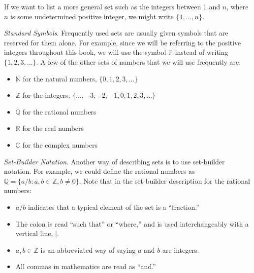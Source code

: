 \documentclass[10pt,]{book}
\theoremstyle{plain}
\theoremstyle{definition}
\begin{document}
If we want to list a more general set such as the integers between 1 and \( n\), where \( n\) is some undetermined positive integer, we
might write \(\{1,\ldots ,n\}\).
%
\par
\emph{ Standard Symbols}. Frequently used sets are usually given symbols that are reserved for them alone. For example, since we will be
referring to the positive integers throughout this book, we will use the symbol \(\mathbb{P}\) instead of writing \(\{1, 2, 3, \ldots \}\). A few
of the other sets of numbers that we will use frequently are: 
\leavevmode%
\begin{itemize}[label=\textbullet]
\item{}\(\mathbb{N}\) for the natural numbers, \(\{0, 1, 2, 3, \ldots \}\)\item{}\(\mathbb{Z}\) for the integers, \(\{\ldots , -3, -2, -1, 0, 1, 2, 3,\ldots \}\)\item{}\(\mathbb{Q}\) for the rational numbers\item{}\(\mathbb{R}\) for the real numbers\item{}\(\mathbb{C}\) for the complex numbers\end{itemize}

%
\par
\emph{ Set-Builder Notation}. Another way of describing sets is to use set-builder notation. For example, we could define the rational numbers as \(\mathbb{Q}=\{a/b : a, b \in  \mathbb{Z}, b\neq 0\}\).  Note that in the set-builder description for the rational numbers: 
\leavevmode%
\begin{itemize}[label=\textbullet]
\item{} \(a/b\) indicates that a typical element of the set is a ``fraction.'' \item{} The colon is read ``such that'' or ``where,'' and is used interchangeably with a vertical line, \(\mid\). 
 \item{} \(a, b\in \mathbb{Z}\) is an abbreviated way of saying \(a\) and \(b\) are integers. 
 \item{} All commas in mathematics are read as ``and.'' 
\end{itemize}
\end{document}
